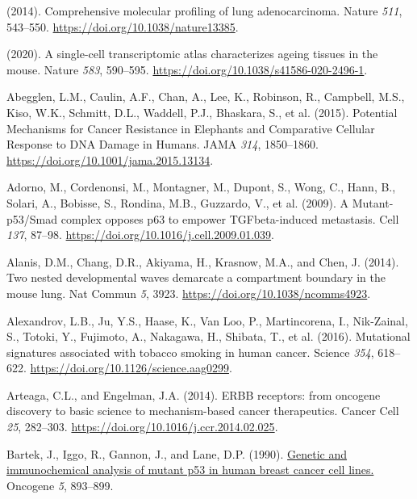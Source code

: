 \hypertarget{refs}{}
\begin{CSLReferences}{0}{0}
\leavevmode{}%
(2014). Comprehensive molecular profiling of lung adenocarcinoma. Nature \emph{511}, 543--550. \url{https://doi.org/10.1038/nature13385}.

\leavevmode{}%
(2020). A single-cell transcriptomic atlas characterizes ageing tissues in the mouse. Nature \emph{583}, 590--595. \url{https://doi.org/10.1038/s41586-020-2496-1}.

\leavevmode{}%
Abegglen, L.M., Caulin, A.F., Chan, A., Lee, K., Robinson, R., Campbell, M.S., Kiso, W.K., Schmitt, D.L., Waddell, P.J., Bhaskara, S., et al. (2015). Potential Mechanisms for Cancer Resistance in Elephants and Comparative Cellular Response to DNA Damage in Humans. JAMA \emph{314}, 1850--1860. \url{https://doi.org/10.1001/jama.2015.13134}.

\leavevmode{}%
Adorno, M., Cordenonsi, M., Montagner, M., Dupont, S., Wong, C., Hann, B., Solari, A., Bobisse, S., Rondina, M.B., Guzzardo, V., et al. (2009). A Mutant-p53/Smad complex opposes p63 to empower TGFbeta-induced metastasis. Cell \emph{137}, 87--98. \url{https://doi.org/10.1016/j.cell.2009.01.039}.

\leavevmode{}%
Alanis, D.M., Chang, D.R., Akiyama, H., Krasnow, M.A., and Chen, J. (2014). Two nested developmental waves demarcate a compartment boundary in the mouse lung. Nat Commun \emph{5}, 3923. \url{https://doi.org/10.1038/ncomms4923}.

\leavevmode{}%
Alexandrov, L.B., Ju, Y.S., Haase, K., Van Loo, P., Martincorena, I., Nik-Zainal, S., Totoki, Y., Fujimoto, A., Nakagawa, H., Shibata, T., et al. (2016). Mutational signatures associated with tobacco smoking in human cancer. Science \emph{354}, 618--622. \url{https://doi.org/10.1126/science.aag0299}.

\leavevmode{}%
Arteaga, C.L., and Engelman, J.A. (2014). ERBB receptors: from oncogene discovery to basic science to mechanism-based cancer therapeutics. Cancer Cell \emph{25}, 282--303. \url{https://doi.org/10.1016/j.ccr.2014.02.025}.

\leavevmode{}%
Bartek, J., Iggo, R., Gannon, J., and Lane, D.P. (1990). \href{https://www.ncbi.nlm.nih.gov/pubmed/1694291}{Genetic and immunochemical analysis of mutant p53 in human breast cancer cell lines.} Oncogene \emph{5}, 893--899.


\end{CSLReferences}
